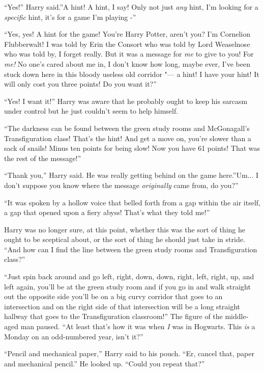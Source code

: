 ``Yes!'' Harry said.''A hint! A hint, I say! Only not just \emph{any}
hint, I'm looking for a \emph{specific} hint, it's for a game I'm
playing -''

``Yes, yes! A hint for the game! You're Harry Potter, aren't you? I'm
Cornelion Flubberwalt! I was told by Erin the Consort who was told by
Lord Weaselnose who was told by, I forget really. But it was a message
for \emph{me} to give to you! For \emph{me!} No one's cared about me in,
I don't know how long, maybe ever, I've been stuck down here in this
bloody useless old corridor "--- a hint! I have your hint! It will only
cost you three points! Do you want it?''

``Yes! I want it!'' Harry was aware that he probably ought to keep his
sarcasm under control but he just couldn't seem to help himself.

``The darkness can be found between the green study rooms and
McGonagall's Transfiguration class! That's the hint! And get a move on,
you're slower than a sack of snails! Minus ten points for being slow!
Now you have 61 points! That was the rest of the message!''

``Thank you,'' Harry said. He was really getting behind on the game
here.''Um... I don't suppose you know where the message
\emph{originally} came from, do you?''

``It was spoken by a hollow voice that belled forth from a gap within
the air itself, a gap that opened upon a fiery abyss! That's what they
told me!''

Harry was no longer sure, at this point, whether this was the sort of
thing he ought to be sceptical about, or the sort of thing he should
just take in stride. ``And how can I find the line between the green
study rooms and Transfiguration class?''

``Just spin back around and go left, right, down, down, right, left,
right, up, and left again, you'll be at the green study room and if you
go in and walk straight out the opposite side you'll be on a big curvy
corridor that goes to an intersection and on the right side of that
intersection will be a long straight hallway that goes to the
Transfiguration classroom!'' The figure of the middle-aged man paused.
``At least that's how it was when \emph{I} was in Hogwarts. This
\emph{is} a Monday on an odd-numbered year, isn't it?''

``Pencil and mechanical paper,'' Harry said to his pouch. ``Er, cancel
that, paper and mechanical pencil.'' He looked up. ``Could you repeat
that?''

